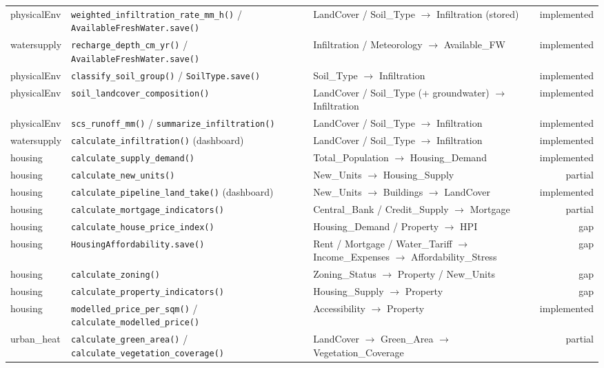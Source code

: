 \documentclass[11pt]{article}
\newcommand{\code}[1]{\texttt{#1}}
\newcommand{\statusdone}{\textcolor{green!50!black}{implemented}}
\newcommand{\statuspartial}{\textcolor{orange!80!black}{partial}}
\newcommand{\statusgap}{\textcolor{red!70!black}{gap}}
\begin{document}
\begin{xltabular}{\linewidth}{l X X r}
physicalEnv & \code{weighted\_infiltration\_rate\_mm\_h()} / \code{AvailableFreshWater.save()} & LandCover / Soil\_Type $\to$ Infiltration (stored) & \statusdone{} \\
watersupply & \code{recharge\_depth\_cm\_yr()} / \code{AvailableFreshWater.save()} & Infiltration / Meteorology $\to$ Available\_FW & \statusdone{} \\
physicalEnv & \code{classify\_soil\_group()} / \code{SoilType.save()} & Soil\_Type $\to$ Infiltration & \statusdone{} \\
physicalEnv & \code{soil\_landcover\_composition()} & LandCover / Soil\_Type (+ groundwater) $\to$ Infiltration & \statusdone{} \\
physicalEnv & \code{scs\_runoff\_mm()} / \code{summarize\_infiltration()} & LandCover / Soil\_Type $\to$ Infiltration & \statusdone{} \\
watersupply & \code{calculate\_infiltration()} (dashboard) & LandCover / Soil\_Type $\to$ Infiltration & \statusdone{} \\
housing & \code{calculate\_supply\_demand()} & Total\_Population $\to$ Housing\_Demand & \statusdone{} \\
housing & \code{calculate\_new\_units()} & New\_Units $\to$ Housing\_Supply & \statuspartial{} \\
housing & \code{calculate\_pipeline\_land\_take()} (dashboard) & New\_Units $\to$ Buildings $\to$ LandCover & \statusdone{} \\
housing & \code{calculate\_mortgage\_indicators()} & Central\_Bank / Credit\_Supply $\to$ Mortgage & \statuspartial{} \\
housing & \code{calculate\_house\_price\_index()} & Housing\_Demand / Property $\to$ HPI & \statusgap{} \\
housing & \code{HousingAffordability.save()} & Rent / Mortgage / Water\_Tariff $\to$ Income\_Expenses $\to$ Affordability\_Stress & \statusgap{} \\
housing & \code{calculate\_zoning()} & Zoning\_Status $\to$ Property / New\_Units & \statusgap{} \\
housing & \code{calculate\_property\_indicators()} & Housing\_Supply $\to$ Property & \statusgap{} \\
housing & \code{modelled\_price\_per\_sqm()} / \code{calculate\_modelled\_price()} & Accessibility $\to$ Property & \statusdone{} \\
urban\_heat & \code{calculate\_green\_area()} / \code{calculate\_vegetation\_coverage()} & LandCover $\to$ Green\_Area $\to$ Vegetation\_Coverage & \statuspartial{} \\

\end{xltabular}
\end{document}
